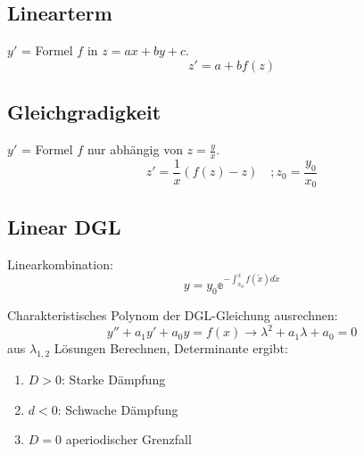 \subsection{Linearterm}
$y'$ = Formel $f$ in $z = ax + by + c$.
\[z' = a + bf(z)\]

\subsection{Gleichgradigkeit}
$y'$ = Formel $f$ nur abhängig von $z = \frac{y}{x}$. 
\[
z' = \frac{1}{x}(f(z) - z) \quad;z_0 = \frac{y_0}{x_0}\]

\subsection{Linear DGL}
Linearkombination:
\[y = y_0\mathbb{e}^{-\int_{x_0}^{x}f(\tilde{x})d\tilde{x}}\]

Charakteristisches Polynom der DGL-Gleichung ausrechnen:
\[y'' + a_1y' + a_0y = f(x) \rightarrow \lambda^2 + a_1\lambda + a_0 = 0\]
aus $\lambda_{1,2}$ Lösungen Berechnen, Determinante ergibt: 
\begin{enumerate}
	\item $D>0$: Starke Dämpfung
	\item $d<0$: Schwache Dämpfung
	\item $D=0$ aperiodischer Grenzfall
\end{enumerate}